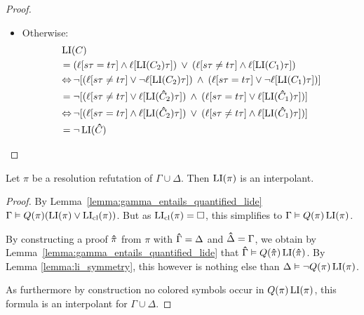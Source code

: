 \documentclass[,%
	draft=false,%
	numbers=noendperiod
	11pt,
	a4paper,
	oneside,%
	openany,
]{memoir}
\begin{document}
\begin{proof}
\begin{itemize}
\begin{itemize}
				\item Otherwise:
					\begin{align*}
						&\operatorname{LI}(C) \\
						&= (\ell[s\tau=t\tau] \land \ell[\operatorname{LI}(C_2)\tau] ) \;\,{\lor}\;\, (\ell[s\tau\neq t\tau] \land \ell[\operatorname{LI}(C_1)\tau]) \\
						&\operatorname{\Leftrightarrow} \lnot [ (\ell[s\tau\neq t\tau] \lor \lnot \ell[\operatorname{LI}(C_2)\tau] ) \;\,{\land}\;\, (\ell[s\tau= t\tau] \lor \lnot \ell[\operatorname{LI}(C_1)\tau]) ] \\
						&= \lnot [ (\ell[s\tau\neq t\tau] \lor \ell[\operatorname{LI}(\bm\hat C_2)\tau] ) \;\,{\land}\;\, (\ell[s\tau= t\tau] \lor \ell[\operatorname{LI}(\bm\hat C_1)\tau]) ] \\
						&\operatorname{\Leftrightarrow} \lnot [ (\ell[s\tau= t\tau] \land \ell[\operatorname{LI}(\bm\hat C_2)\tau] ) \;\,{\lor}\;\, (\ell[s\tau\neq t\tau] \land \ell[\operatorname{LI}(\bm\hat C_1)\tau]) ] \\
						&= \lnot \operatorname{LI}(\bm\hat C)
						\qedhere
					\end{align*}



			\end{itemize}


			\qedhere

	\end{itemize}
\end{proof}

\begin{thm}
	Let $\pi$ be a resolution refutation of $\Gamma\cup\Delta$.
	Then $\operatorname{LI}( \pi )$ is an interpolant.
\end{thm}
\begin{proof}
	By Lemma~\ref{lemma:gamma_entails_quantified_lide}
	$\Gamma \vDash Q(\pi)(\operatorname{LI}(\pi) \lor \operatorname{LI}_{\operatorname{cl}}(\pi))$.
	But as $\operatorname{LI}_{\operatorname{cl}}(\pi) = \square$, this simplifies to
	$\Gamma \vDash Q(\pi)\operatorname{LI}(\pi)$.

	By constructing a proof $\bm\hat \pi$ from $\pi$ with $\bm\hat \Gamma = \Delta$ and $\bm\hat \Delta = \Gamma$, we obtain by Lemma~\ref{lemma:gamma_entails_quantified_lide} that $\bm\hat\Gamma \vDash Q(\bm\hat \pi)\operatorname{LI}(\bm\hat \pi)$.
	By Lemma \ref{lemma:li_symmetry}, this however is nothing else than
	$\Delta \vDash \lnot Q(\pi) \operatorname{LI}(\pi)$. 

	As furthermore by construction no colored symbols occur in $Q(\pi) \operatorname{LI}(\pi)$, this formula is an interpolant for $\Gamma\cup\Delta$.
\end{proof}
\end{document}
